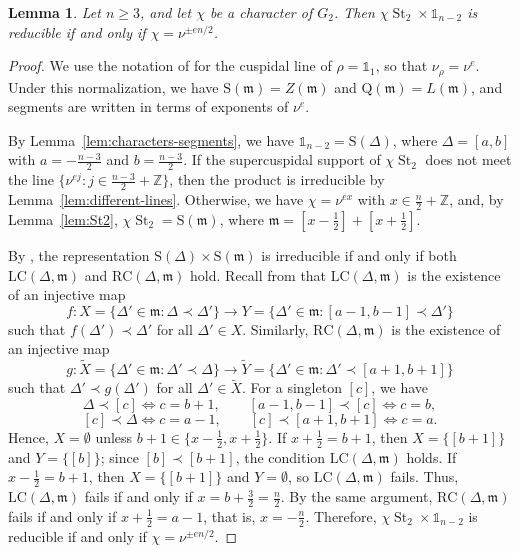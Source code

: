 \documentclass[11pt]{amsart}
\numberwithin{equation}{section}
\theoremstyle{plain}
\newtheorem{lemma}[theorem]{Lemma}
\theoremstyle{definition}
\theoremstyle{remark}
\newcommand{\Z}{\mathbb{Z}}
\newcommand{\one}{\mathds{1}}
\DeclareMathOperator{\St}{St}
\newcommand{\mm}{\mathfrak{m}}
\newcommand{\Ss}{\mathrm{S}}
\newcommand{\Qq}{\mathrm{Q}}
\begin{document}
\begin{lemma}\label{lem:St2-times-one}
	Let $n\ge3$, and let $\chi$ be a character of $G_2$. Then $\chi\St_2\times\one_{n-2}$ is reducible if and only if $\chi=\nu^{\pm en/2}$.
\end{lemma}
\begin{proof}
	We use the notation of \cite[\S3]{LM16} for the cuspidal line of $\rho=\one_1$, so that $\nu_\rho=\nu^{e}$. Under this normalization, we have $\Ss(\mm)=Z(\mm)$ and $\Qq(\mm)=L(\mm)$, and segments are written in terms of exponents of $\nu^{e}$.
	
	By Lemma~\ref{lem:characters-segments}, we have $\one_{n-2}=\Ss(\Delta)$, where $\Delta=[a,b]$ with $a=-\frac{n-3}2$ and $b=\frac{n-3}2$. If the supercuspidal support of $\chi\St_2$ does not meet the line $\{\nu^{ej}:j\in\frac{n-3}2+\Z\}$, then the product is irreducible by Lemma~\ref{lem:different-lines}. Otherwise, we have $\chi=\nu^{ex}$ with $x\in\frac n2+\Z$, and, by Lemma~\ref{lem:St2}, $\chi\St_2=\Ss(\mm)$, where $\mm=[x-\frac12]+[x+\frac12]$.
	
	By \cite[Corollary~5.14]{LM16}, the representation $\Ss(\Delta)\times\Ss(\mm)$ is irreducible if and only if both $\mathrm{LC}(\Delta,\mm)$ and $\mathrm{RC}(\Delta,\mm)$ hold. Recall from \cite[\S\S5.5--5.6]{LM16} that $\mathrm{LC}(\Delta,\mm)$ is the existence of an injective map
	$$
	f\colon X=\{\Delta'\in\mm:\Delta\prec\Delta'\}\longrightarrow Y=\{\Delta'\in\mm:[a-1,b-1]\prec\Delta'\}
	$$
	such that $f(\Delta')\prec\Delta'$ for all $\Delta'\in X$. Similarly, $\mathrm{RC}(\Delta,\mm)$ is the existence of an injective map
	$$
	g\colon \widetilde X=\{\Delta'\in\mm:\Delta'\prec\Delta\}\longrightarrow \widetilde Y=\{\Delta'\in\mm:\Delta'\prec[a+1,b+1]\}
	$$
	such that $\Delta'\prec g(\Delta')$ for all $\Delta'\in\widetilde X$. For a singleton $[c]$, we have
	$$
	\Delta\prec[c]\iff c=b+1,\qquad [a-1,b-1]\prec[c]\iff c=b,
	$$
	$$
	[c]\prec\Delta\iff c=a-1,\qquad [c]\prec[a+1,b+1]\iff c=a.
	$$
	Hence, $X=\emptyset$ unless $b+1\in\{x-\frac12,x+\frac12\}$. If $x+\frac12=b+1$, then $X=\{[b+1]\}$ and $Y=\{[b]\}$; since $[b]\prec[b+1]$, the condition $\mathrm{LC}(\Delta,\mm)$ holds. If $x-\frac12=b+1$, then $X=\{[b+1]\}$ and $Y=\emptyset$, so $\mathrm{LC}(\Delta,\mm)$ fails. Thus, $\mathrm{LC}(\Delta,\mm)$ fails if and only if $x=b+\frac32=\frac n2$. By the same argument, $\mathrm{RC}(\Delta,\mm)$ fails if and only if $x+\frac12=a-1$, that is, $x=-\frac n2$. Therefore, $\chi\St_2\times\one_{n-2}$ is reducible if and only if $\chi=\nu^{\pm en/2}$.
\end{proof}
\end{document}
